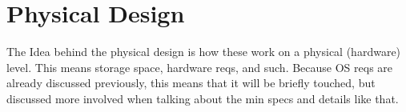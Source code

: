 
\section{Physical Design}

The Idea behind the physical design is how these work on a physical (hardware) level. This means storage space, hardware reqs, and such. Because OS reqs are already discussed previously, this means that it will be briefly touched, but discussed more involved when talking about the min specs and details like that.

